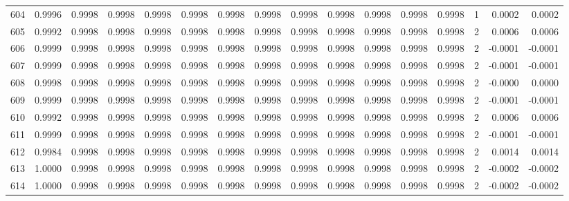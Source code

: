 \begin{tabular}{lrrrrrrrrrrrrrrr}
604 &      0.9996 &  0.9998 &  0.9998 &  0.9998 &  0.9998 &  0.9998 &  0.9998 &  0.9998 &  0.9998 &  0.9998 &   0.9998 &     0.9998 &      1 &                    0.0002 &                     0.0002 \\
605 &      0.9992 &  0.9998 &  0.9998 &  0.9998 &  0.9998 &  0.9998 &  0.9998 &  0.9998 &  0.9998 &  0.9998 &   0.9998 &     0.9998 &      2 &                    0.0006 &                     0.0006 \\
606 &      0.9999 &  0.9998 &  0.9998 &  0.9998 &  0.9998 &  0.9998 &  0.9998 &  0.9998 &  0.9998 &  0.9998 &   0.9998 &     0.9998 &      2 &                   -0.0001 &                    -0.0001 \\
607 &      0.9999 &  0.9998 &  0.9998 &  0.9998 &  0.9998 &  0.9998 &  0.9998 &  0.9998 &  0.9998 &  0.9998 &   0.9998 &     0.9998 &      2 &                   -0.0001 &                    -0.0001 \\
608 &      0.9998 &  0.9998 &  0.9998 &  0.9998 &  0.9998 &  0.9998 &  0.9998 &  0.9998 &  0.9998 &  0.9998 &   0.9998 &     0.9998 &      2 &                   -0.0000 &                     0.0000 \\
609 &      0.9999 &  0.9998 &  0.9998 &  0.9998 &  0.9998 &  0.9998 &  0.9998 &  0.9998 &  0.9998 &  0.9998 &   0.9998 &     0.9998 &      2 &                   -0.0001 &                    -0.0001 \\
610 &      0.9992 &  0.9998 &  0.9998 &  0.9998 &  0.9998 &  0.9998 &  0.9998 &  0.9998 &  0.9998 &  0.9998 &   0.9998 &     0.9998 &      2 &                    0.0006 &                     0.0006 \\
611 &      0.9999 &  0.9998 &  0.9998 &  0.9998 &  0.9998 &  0.9998 &  0.9998 &  0.9998 &  0.9998 &  0.9998 &   0.9998 &     0.9998 &      2 &                   -0.0001 &                    -0.0001 \\
612 &      0.9984 &  0.9998 &  0.9998 &  0.9998 &  0.9998 &  0.9998 &  0.9998 &  0.9998 &  0.9998 &  0.9998 &   0.9998 &     0.9998 &      2 &                    0.0014 &                     0.0014 \\
613 &      1.0000 &  0.9998 &  0.9998 &  0.9998 &  0.9998 &  0.9998 &  0.9998 &  0.9998 &  0.9998 &  0.9998 &   0.9998 &     0.9998 &      2 &                   -0.0002 &                    -0.0002 \\
614 &      1.0000 &  0.9998 &  0.9998 &  0.9998 &  0.9998 &  0.9998 &  0.9998 &  0.9998 &  0.9998 &  0.9998 &   0.9998 &     0.9998 &      2 &                   -0.0002 &                    -0.0002 \\

\end{tabular}
